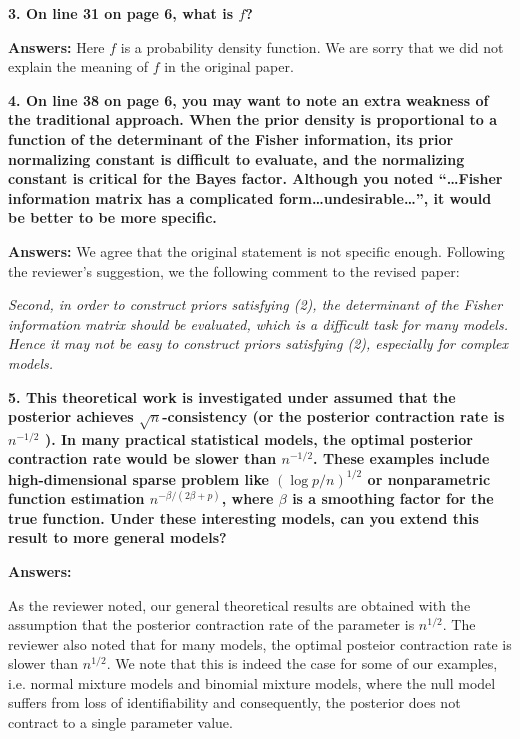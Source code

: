\documentclass[11pt]{article}
\theoremstyle{plain}
\theoremstyle{definition}
\theoremstyle{remark}
\begin{document}
\textbf{
    3. On line 31 on page 6, what is $f$?
}

\textbf{Answers:}
Here $f$ is a probability density function.
We are sorry that we did not explain the meaning of $f$ in the original paper.

\textbf{
    4. On line 38 on page 6, you may want to note an extra weakness of the traditional approach.
    When the prior density is proportional to a function of the determinant of the Fisher information, its prior normalizing constant is difficult to evaluate, and the normalizing constant is critical for the Bayes factor.
    Although you noted ``\dots Fisher information matrix has a complicated form\dots undesirable\dots'', it would be better to be more specific.
}

\textbf{Answers:}
We agree that the original statement is not specific enough.
Following the reviewer's suggestion, we the following comment to the revised paper:
\begin{adjustwidth}{1.5em}{1.5em}
    \emph{
        Second, 
        in order to construct priors satisfying (2), the determinant of the Fisher information matrix should be evaluated, which is a difficult task for many models.
        Hence it may not be easy to construct priors satisfying (2), especially for complex models.
}
\end{adjustwidth}





\textbf{
    5. This theoretical work is investigated under assumed that the posterior achieves $\sqrt n$-consistency (or the posterior contraction rate is $n^{−1/2}$ ).
    In many practical statistical models, the optimal posterior contraction rate would be slower than $n^{-1/2}$.
    These examples include high-dimensional sparse problem like $(\log p /n)^{1/2}$ or nonparametric function estimation $n^{-\beta / (2\beta + p)}$, where $\beta$ is a smoothing factor for the true function.
    Under these interesting models, can you extend this result to more general models?
}

\textbf{Answers:}

As the reviewer noted, our general theoretical results are obtained with the assumption that the posterior contraction rate of the parameter is $n^{1/2}$.
The reviewer also noted that for many models, the optimal posteior contraction rate is slower than $n^{1/2}$.
We note that this is indeed the case for some of our examples, i.e. normal mixture models and binomial mixture models, where the null model suffers from loss of identifiability and consequently, the posterior does not contract to a single parameter value.
\end{document}
